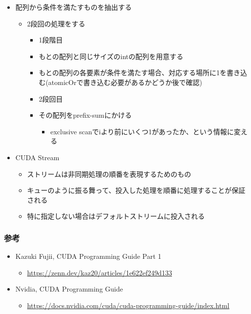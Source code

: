 \documentclass[12pt,a4paper,uplatex]{jsarticle}
\begin{document}
\begin{itemize}
\begin{itemize}
\begin{itemize}
    \end{itemize}
    \begin{lstlisting}[caption=内部処理の順番,label=internalProcessOrder]
tmp = data[i];       // load
tmp = tmp | mask;    // OR
data[i] = tmp;       // store
    \end{lstlisting}
    \item 競合が起きなかったらatomicOr()を使う必要はまったくないということか...?
  \end{itemize}
  \item 配列から条件を満たすものを抽出する
  \begin{itemize}
    \item 2段回の処理をする
    \begin{itemize}
      \item 1段階目
      \item もとの配列と同じサイズのintの配列を用意する
      \item もとの配列の各要素が条件を満たす場合、対応する場所に1を書き込む(atomicOrで書き込む必要があるかどうか後で確認)
      \item 2段回目
      \item その配列をprefix-sumにかける
      \begin{itemize}
        \item exclusive scanでiより前にいくつ1があったか、という情報に変える
      \end{itemize}
    \end{itemize}
  \end{itemize}
  \item CUDA Stream
  \begin{itemize}
    \item ストリームは非同期処理の順番を表現するためのもの
    \item キューのように振る舞って、投入した処理を順番に処理することが保証される
    \item 特に指定しない場合はデフォルトストリームに投入される
  \end{itemize}
\end{itemize}

\subsubsection*{参考}
\begin{itemize}
  \item Kazuki Fujii, CUDA Programming Guide Part 1
  \begin{itemize}
    \item \url{https://zenn.dev/kaz20/articles/1e622ef249d133}
  \end{itemize}
  \item Nvidia, CUDA Programming Guide
  \begin{itemize}
    \item \url{https://docs.nvidia.com/cuda/cuda-programming-guide/index.html}
  \end{itemize}
\end{itemize}
\end{document}
